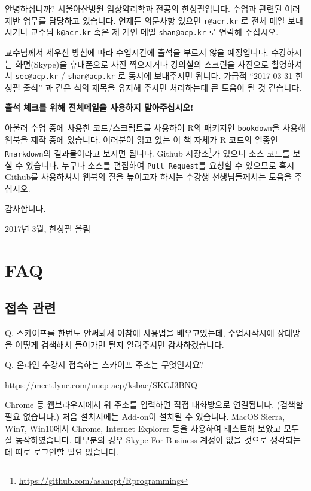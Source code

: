 \documentclass[10pt,]{krantz}
\renewenvironment{quote}{\begin{VF}}{\end{VF}}
\renewcommand{\href}[2]{#2\footnote{\url{#1}}}
\begin{document}
안녕하십니까? 서울아산병원 임상약리학과 전공의 한성필입니다. 수업과
관련된 여러 제반 업무를 담당하고 있습니다. 언제든 의문사항 있으면
\texttt{r@acr.kr} 로 전체 메일 보내시거나 교수님 \texttt{k@acr.kr} 혹은
제 개인 메일 \texttt{shan@acp.kr} 로 연락해 주십시오.

교수님께서 세우신 방침에 따라 수업시간에 출석을 부르지 않을 예정입니다.
수강하시는 화면(Skype)을 휴대폰으로 사진 찍으시거나 강의실의 스크린을
사진으로 촬영하셔서 \texttt{sec@acp.kr} / \texttt{shan@acp.kr} 로 동시에
보내주시면 됩니다. 가급적 ``2017-03-31 한성필 출석'' 과 같은 식의 제목을
유지해 주시면 처리하는데 큰 도움이 될 것 같습니다.

\textbf{출석 체크를 위해 전체메일을 사용하지 말아주십시오!}

아울러 수업 중에 사용한 코드/스크립트를 사용하여 R의 패키지인
\texttt{bookdown}을 사용해 웹북을 제작 중에 있습니다. \citep{R-bookdown}
 여러분이 읽고 있는 이 책 자체가 R 코드의 일종인
\texttt{Rmarkdown}의 결과물이라고 보시면 됩니다.
\href{https://github.com/asancpt/Rprogramming}{Github 저장소}가 있으니
소스 코드를 보실 수 있습니다. 누구나 소스를 편집하여
\texttt{Pull\ Request}를 요청할 수 있으므로 혹시 Github를 사용하셔서
웹북의 질을 높이고자 하시는 수강생 선생님들께서는 도움을 주십시오.

감사합니다.

2017년 3월, 한성필 올림

\section*{FAQ}\label{faq}


\subsection*{접속 관련}\label{-}


\begin{quote}
Q. 스카이프를 한번도 안써봐서 이참에 사용법을 배우고있는데, 수업시작시에
상대방을 어떻게 검색해서 들어가면 될지 알려주시면 감사하겠습니다.
\end{quote}

\begin{quote}
Q. 온라인 수강시 접속하는 스카이프 주소는 무엇인지요?
\end{quote}

\url{https://meet.lync.com/uucp-acp/ksbae/SKGJ3BNQ}

Chrome 등 웹브라우저에서 위 주소를 입력하면 직접 대화방으로 연결됩니다.
(검색할 필요 없습니다.) 처음 설치시에는 Add-on이 설치될 수 있습니다.
MacOS Sierra, Win7, Win10에서 Chrome, Internet Explorer 등을 사용하여
테스트해 보았고 모두 잘 동작하였습니다. 대부분의 경우 Skype For Business
계정이 없을 것으로 생각되는데 따로 로그인할 필요 없습니다.
\end{document}

